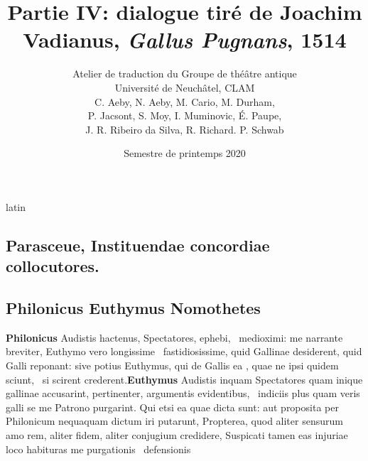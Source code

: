 \documentclass[12pt]{book}
\renewenvironment{latin}
    	{\begin{hyphenrules}{latin}}
    	{\end{hyphenrules}}
\begin{document}
        \title{Partie IV: dialogue tiré de Joachim Vadianus, \textit{Gallus Pugnans}, 1514}
        \author{Atelier de traduction du Groupe de théâtre antique\\
            Université de Neuchâtel, CLAM\\
            C. Aeby, N. Aeby, M. Cario, M. Durham,\\ 
            P. Jacsont, S. Moy, I. Muminovic, É. Paupe,\\
            J. R. Ribeiro da Silva, R. Richard. P. Schwab}
        \date{Semestre de printemps 2020}
        
        \maketitle
        \begin{pages}
        \begin{latin}
        \begin{Leftside}
        \beginnumbering 
            \pstart\section*{Parasceue, Instituendae concordiae collocutores.}\pend\pstart\subsection*{ Philonicus Euthymus Nomothetes}\pend\pstart\textbf{Philonicus }\hspace{1cm} Audistis hactenus, Spectatores, ephebi,  ﻿\ampersand\ medioximi: me narrante 
            breviter, Euthymo vero longissime ﻿\ampersand\ fastidiosissime, quid Gallinae desiderent, quid Galli reponant:
            sive potius Euthymus, qui de Gallis ea , quae ne ipsi quidem sciunt, ﻿\ampersand\ si scirent  crederent.\pend\pstart\textbf{Euthymus  }\hspace{1cm} Audistis inquam Spectatores quam inique gallinae accusarint,  pertinenter, argumentis evidentibus, ﻿\ampersand\ indiciis plus quam veris galli se me Patrono
            purgarint. Qui etsi ea quae dicta sunt: aut proposita per Philonicum nequaquam dictum iri putarunt, Propterea, quod aliter sensurum amo
            rem, aliter fidem, aliter conjugium credidere, Suspicati tamen  eas injuriae loco habituras me purgationis ﻿\ampersand\ defensionis

\end{Leftside}
\end{latin}
\end{pages}
\end{document}

